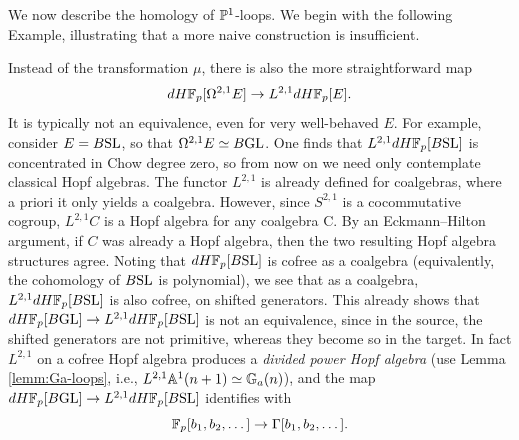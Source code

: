 \documentclass{amsart}
\numberwithin{proposition}{section}
\numberwithin{equation}{section}
\newcommand{\Ga}{{\mathbb{G}_a}}
\def\dHFp{dH\F_p}
\def\hLoops{L}
\begin{document}
\subsubsection{}
We now describe the homology of $\P^1$-loops.
We begin with the following Example, illustrating that a more naive construction is insufficient.

\begin{example}
Instead of the transformation $\mu$, there is also the more straightforward map \[ \dHFp[\Omega^{2,1}E] \to \hLoops^{2,1}\dHFp[E]. \]
It is typically not an equivalence, even for very well-behaved $E$.
For example, consider $E = B\SL$, so that $\Omega^{2,1} E \wequi B\GL$.
One finds that $\hLoops^{2,1}\dHFp[B\SL]$ is concentrated in Chow degree zero, so from now on we need only contemplate classical Hopf algebras.
The functor $\hLoops^{2,1}$ is already defined for coalgebras, where a priori it only yields a coalgebra.
However, since $S^{2,1}$ is a cocommutative cogroup, $\hLoops^{2,1}C$ is a Hopf algebra for any coalgebra C.
By an Eckmann--Hilton argument, if $C$ was already a Hopf algebra, then the two resulting Hopf algebra structures agree.
Noting that $\dHFp[B\SL]$ is cofree as a coalgebra (equivalently, the cohomology of $B\SL$ is polynomial), we see that as a coalgebra, $\hLoops^{2,1}\dHFp[B\SL]$ is also cofree, on shifted generators.
This already shows that $\dHFp[B\GL] \to \hLoops^{2,1}\dHFp[B\SL]$ is not an equivalence, since in the source, the shifted generators are not primitive, whereas they become so in the target.
In fact $\hLoops^{2,1}$ on a cofree Hopf algebra produces a \emph{divided power Hopf algebra} (use Lemma \ref{lemm:Ga-loops}, i.e., $\hLoops^{2,1} \A^1(n+1) \wequi \Ga(n)$), and the map $\dHFp[B\GL] \to L^{2,1}\dHFp[B\SL]$ identifies with \[ \F_p[b_1, b_2, \dots] \to \Gamma[b_1,b_2,\dots] .\]
\end{example}
\end{document}
